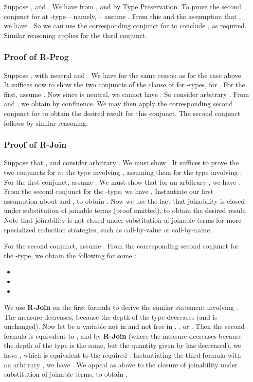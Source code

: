 \documentclass[copyright]{eptcs}
\begin{document}
Suppose , and
.  We have  from , and  by Type Preservation.  To prove the second conjunct for
 at -type -- namely,  -- assume .  From this and the
assumption that , we have .  So we can
use the corresponding conjunct for  to conclude ,
as required.  Similar reasoning applies for the third conjunct.

\subsubsection{Proof of \textbf{R-Prog}}

Suppose ,
with  neutral and .  We have  for the
same reason as for the  case above.  It suffices now to show the
two conjuncts of the clause of  for -types, for
.  For the first, assume .  Now since  is
neutral, we cannot have .  So consider arbitrary
.  From  and , we obtain
 by confluence.  We may then apply the corresponding
second conjunct for  to obtain the desired result for this
conjunct.  The second conjunct follows by similar reasoning.

\subsubsection{Proof of \textbf{R-Join}}

Suppose that , and consider arbitrary
.  We must show
.  It suffices
to prove the two conjuncts for  at the type involving
, assuming them for the type involving .  For the first
conjunct, assume .  We must show that for an
arbitrary , we have .  From the second conjunct for the -type,
we have .  Instantiate our first
assumption about  and , to obtain .  Now we use the fact that joinability is closed under
substitution of joinable terms (proof omitted), to obtain the desired
result.  Note that joinability is not closed under substitution of
joinable terms for more specialized reduction strategies, such as
call-by-value or call-by-name.

For the second conjunct, assume .  From
the corresponding second conjunct for the -type, we obtain the
following for some :
\begin{itemize}
\item 
\item 
\item  
\end{itemize}
\noindent We use \textbf{R-Join} on the first formula to derive the
similar statement involving . The measure
 decreases, because the depth of the type
decreases (and  is unchanged).  Now let  be a variable
not in  and not free in , , or .
Then the second formula is equivalent to
, and
by \textbf{R-Join} (where the measure decreases because the depth of
the type is the same, but the quantity given by  has
decreased), we have
, which
is equivalent to the required
.
Instantiating the third formula with an arbitrary
, we have .  We appeal as above to the closure of joinability under
substitution of joinable terms, to obtain .
\end{document}
